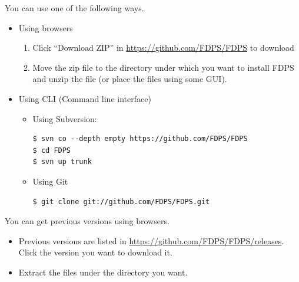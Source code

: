 You can use one of the following ways.
\begin{itemize}
\item Using browsers
\begin{enumerate}
\item Click ``Download ZIP'' in \url{https://github.com/FDPS/FDPS} to download 
\item Move the zip file to the directory under which you want to install FDPS and unzip the file (or place the files using some GUI).
\end{enumerate}
\item Using CLI (Command line interface)
\begin{itemize}
\item Using Subversion:
\begin{screen}
\begin{verbatim}
$ svn co --depth empty https://github.com/FDPS/FDPS
$ cd FDPS
$ svn up trunk
\end{verbatim}
\end{screen}
\item Using Git
\begin{screen}
\begin{verbatim}
$ git clone git://github.com/FDPS/FDPS.git
\end{verbatim}
\end{screen}    
\end{itemize}
\end{itemize}

You can get previous versions using browsers.
\begin{itemize}
\item Previous versions are listed in \url{https://github.com/FDPS/FDPS/releases}. Click the version you want to download it.
\item Extract the files under the directory you want.
\end{itemize}

